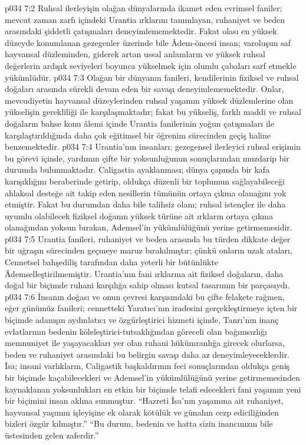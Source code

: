 \vs p034 7:2 Ruhsal ilerleyişin olağan dünyalarında ikamet eden evrimsel faniler; mevcut zaman zarfı içindeki Urantia ırklarını tanımlayan, ruhaniyet ve beden arasındaki şiddetli çatışmaları deneyimlememektedir. Fakat olası en yüksek düzeyde konumlanan gezegenler üzerinde bile Âdem\hyp{}öncesi insan; varoluşun saf hayvansal düzleminden, giderek artan ussal anlamların ve yüksek ruhsal değerlerin ardışık seviyeleri boyunca yükselmek için olumlu çabaları sarf etmekle yükümlüdür.
\vs p034 7:3 Olağan bir dünyanın fanileri, kendilerinin fiziksel ve ruhsal doğaları arasında sürekli devam eden bir savaşı deneyimlememektedir. Onlar, mevcudiyetin hayvansal düzeylerinden ruhsal yaşamın yüksek düzlemlerine olan yükselişin gerekliliği ile karşılaşmaktadır; fakat bu yükseliş, farklı maddi ve ruhsal doğaların bahse konu âlemi içinde Urantia fanilerinin yoğun çatışmaları ile karşılaştırıldığında daha çok eğitimsel bir öğrenim sürecinden geçiş haline benzemektedir.
\vs p034 7:4 Urantia’nın insanları; gezegensel ilerleyici ruhsal erişimin bu görevi içinde, yardımın çifte bir yoksunluğunun sonuçlarından muzdarip bir durumda bulunmaktadır. Caligastia ayaklanması; dünya çapında bir kafa karışıklığını beraberinde getirip, oldukça düzenli bir toplumun sağlayabileceği ahlaksal desteğe ait takip eden nesillerin tümünün ortaya çıkma olanağını yok etmiştir. Fakat bu durumdan daha bile talihsiz olanı; ruhsal istençler ile daha uyumlu olabilecek fiziksel doğanın yüksek türüne ait ırkların ortaya çıkma olanağından yoksun bırakan, Ademsel’in yükümlülüğünü yerine getirmemesidir.
\vs p034 7:5 Urantia fanileri, ruhaniyet ve beden arasında bu türden dikkate değer bir uğraşın sürecinden geçmeye maruz bırakılmıştır; çünkü onların uzak ataları, Cennetsel bahşediliş tarafından daha yeterli bir bütünlükte Âdemselleştirilmemiştir. Urantia’nın fani ırklarına ait fiziksel doğaların, daha doğal bir biçimde ruhani karşılığa sahip olması kutsal tasarımın bir parçasıydı.
\vs p034 7:6 İnsanın doğası ve onun çevresi karşısındaki bu çifte felakete rağmen, eğer günümüz fanileri; cennetteki Yaratıcı’nın iradesini gerçekleştirmeye içten bir biçimde adanışın aydınlatıcı ve özgürleştirici hizmeti içinde, Tanrı’nın inanç evlatlarının bedenin köleleştirici\hyp{}tutsaklığından göreceli olan bağımsızlığı memnuniyet ile yaşayacakları yer olan ruhani hükümranlığa girecek olurlarsa, beden ve ruhaniyet arasındaki bu belirgin savaşı daha az deneyimleyeceklerdir. İsa; insani varlıkların, Caligastik başkaldırının feci sonuçlarından oldukça geniş bir biçimde kaçabilecekleri ve Ademsel’in yükümlülüğünü yerine getirmemesinden kaynaklanan yoksunlukları en etkin bir biçimde telafi edecekleri fani yaşamın yeni bir biçimini insan aklına sunmuştur. “Hazreti İsa’nın yaşamına ait ruhaniyet, hayvansal yaşımın işleyişine ek olarak kötülük ve günahın cezp ediciliğinden bizleri özgür kılmıştır.” “Bu durum, bedenin ve hatta sizin inancınızın bile üstesinden gelen zaferdir.”
